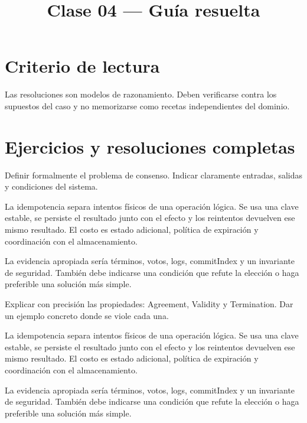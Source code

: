 \documentclass[variant=guia,cover=institutional,mode=screen]{ua-engineering-v6-article}
\title{Clase 04 --- Guía resuelta}
\author{\UAProfessor}
\date{\UADate}
\begin{document}
\section{Criterio de lectura}
Las resoluciones son modelos de razonamiento. Deben verificarse contra los supuestos del caso y no memorizarse como recetas independientes del dominio.

\section{Ejercicios y resoluciones completas}
\begin{uaexercise}
Definir formalmente el problema de consenso. Indicar claramente entradas, salidas y condiciones del sistema.
\end{uaexercise}
\begin{uaanswer}
La idempotencia separa intentos físicos de una operación lógica. Se usa una clave estable, se persiste el resultado junto con el efecto y los reintentos devuelven ese mismo resultado. El costo es estado adicional, política de expiración y coordinación con el almacenamiento.

La evidencia apropiada sería términos, votos, logs, commitIndex y un invariante de seguridad. También debe indicarse una condición que refute la elección o haga preferible una solución más simple.
\end{uaanswer}

\begin{uaexercise}
Explicar con precisión las propiedades:
Agreement, Validity y Termination.  
Dar un ejemplo concreto donde se viole cada una.
\end{uaexercise}
\begin{uaanswer}
La idempotencia separa intentos físicos de una operación lógica. Se usa una clave estable, se persiste el resultado junto con el efecto y los reintentos devuelven ese mismo resultado. El costo es estado adicional, política de expiración y coordinación con el almacenamiento.

La evidencia apropiada sería términos, votos, logs, commitIndex y un invariante de seguridad. También debe indicarse una condición que refute la elección o haga preferible una solución más simple.
\end{uaanswer}
\end{document}
